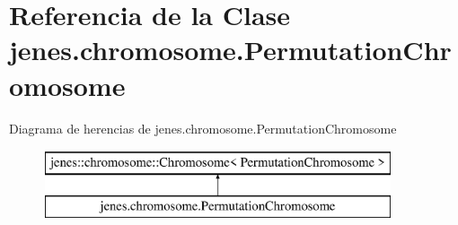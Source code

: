 \hypertarget{classjenes_1_1chromosome_1_1_permutation_chromosome}{\section{Referencia de la Clase jenes.\-chromosome.\-Permutation\-Chromosome}
\label{classjenes_1_1chromosome_1_1_permutation_chromosome}
}
Diagrama de herencias de jenes.\-chromosome.\-Permutation\-Chromosome\begin{figure}[H]
\begin{center}
\leavevmode
\includegraphics[height=2.000000cm]{classjenes_1_1chromosome_1_1_permutation_chromosome}
\end{center}
\end{figure}
